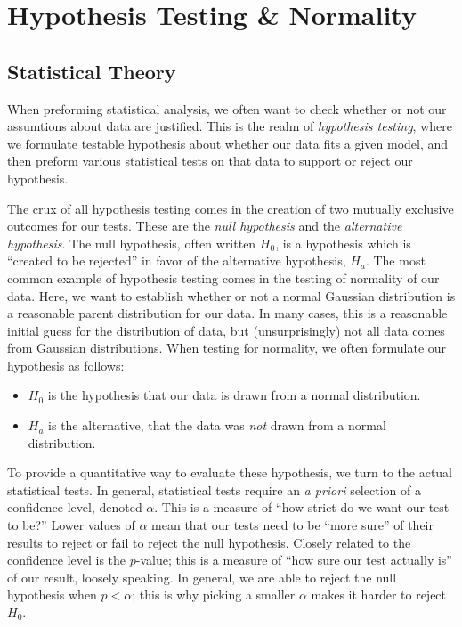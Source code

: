 \chapter{Hypothesis Testing \& Normality}

\section{Statistical Theory}
When preforming statistical analysis, we often want to check whether or not our assumtions about data are justified. This is the realm of \emph{hypothesis testing}, where we formulate testable hypothesis about whether our data fits a given model, and then preform various statistical tests on that data to support or reject our hypothesis.

The crux of all hypothesis testing comes in the creation of two mutually exclusive outcomes for our tests. These are the \emph{null hypothesis} and the \emph{alternative hypothesis}. The null hypothesis, often written $H_0$, is a hypothesis which is ``created to be rejected'' in favor of the alternative hypothesis, $H_a$. The most common example of hypothesis testing comes in the testing of normality of our data. Here, we want to establish whether or not a normal Gaussian distribution is a reasonable parent distribution for our data. In many cases, this is a reasonable initial guess for the distribution of data, but (unsurprisingly) not all data comes from Gaussian distributions. When testing for normality, we often formulate our hypothesis as follows:
\begin{itemize}
	\item $H_0$ is the hypothesis that our data is drawn from a normal distribution.
	\item $H_a$ is the alternative, that the data was \emph{not} drawn from a normal distribution.
\end{itemize}

To provide a quantitative way to evaluate these hypothesis, we turn to the actual statistical tests. In general, statistical tests require an \emph{a priori} selection of a confidence level, denoted $\alpha$. This is a measure of ``how strict do we want our test to be?'' Lower values of $\alpha$ mean that our tests need to be ``more sure'' of their results to reject or fail to reject the null hypothesis. Closely related to the confidence level is the $p$-value; this is a measure of ``how sure our test actually is'' of our result, loosely speaking. In general, we are able to reject the null hypothesis when $p < \alpha$; this is why picking a smaller $\alpha$ makes it harder to reject $H_0$.

